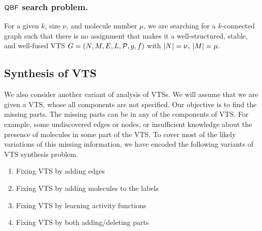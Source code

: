 \subsubsection{$\mathsf{QBF}$ search problem.} For a given $k$, size $\nu$, and molecule number $\mu$, we are searching for a $k$-connected graph such that there is no assignment that makes it a well-structured, stable, and well-fused VTS $G = (N,M,E,L,\mathcal{P},g,f)$ with $|N| = \nu$, $|M| = \mu$.    

%

\subsection{Synthesis of VTS}
%
\noindent We also consider another variant of analysis of VTSs.
%
We will assume that we are given a VTS, whose all components
are not specified.
%
Our objective is to find the missing parts.
%
The missing parts can be in any of the components of VTS. 
%
For example, some undiscovered edges or nodes, or insufficient
knowledge about the presence of molecules in some part of the VTS.
%
To cover most of the likely variations of this missing information,
we have encoded the following variants of VTS synthesis problem.

\begin{enumerate}
	\item Fixing VTS by adding edges 
	\item Fixing VTS by adding molecules to the labels
	\item Fixing VTS by learning activity functions
	\item  Fixing VTS by both adding/deleting parts
\end{enumerate}

